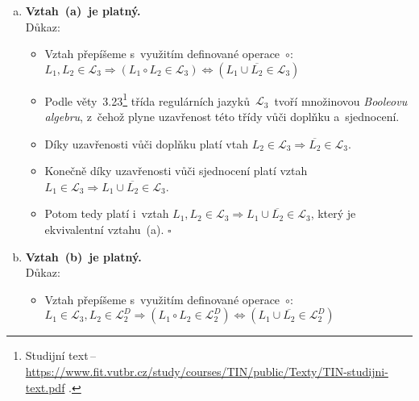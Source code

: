 \documentclass[a4paper, 11pt]{scrartcl}
\newcommand*{\QEDB}{\hfill\ensuremath{\square}}
\begin{document}
    \begin{enumerate}[(a)]
        \item
            \textbf{Vztah~(a)~je platný.} \\
            Důkaz:
            \begin{itemize}
                \item
                    Vztah přepíšeme s~využitím definované operace~$ \circ $: \\
                    $ L_1, L_2 \in \mathcal{L}_3 \Rightarrow (L_1 \circ L_2 \in
                    \mathcal{L}_3) \Leftrightarrow (L_1 \cup \overline{L_2} \in
                    \mathcal{L}_3) $

                \item
                    Podle věty~3.23\footnote{\label{tin}Studijní text\,--\,%
                        \url{https://www.fit.vutbr.cz/study/courses/TIN/public/Texty/TIN-studijni-text.pdf}%
                    .}
                    třída regulárních jazyků~$ \mathcal{L}_3 $~tvoří množinovou
                    \emph{Booleovu algebru}, z~čehož plyne uzavřenost této
                    třídy vůči doplňku a~sjednocení.

                \item
                    Díky uzavřenosti vůči doplňku platí vtah $ L_2 \in
                    \mathcal{L}_3 \Rightarrow \overline{L_2} \in
                    \mathcal{L}_3 $.

                \item
                    Konečně díky uzavřenosti vůči sjednocení platí vztah $ L_1
                    \in \mathcal{L}_3 \Rightarrow L_1 \cup \overline{L_2} \in
                    \mathcal{L}_3 $.

                \item
                    Potom tedy platí i~vztah $ L_1, L_2 \in \mathcal{L}_3
                    \Rightarrow L_1 \cup \overline{L_2} \in \mathcal{L}_3 $,
                    který je ekvivalentní vztahu~(a). \QEDB
            \end{itemize}

        \item
            \textbf{Vztah~(b)~je platný.} \\
            Důkaz:
            \begin{itemize}
                \item
                    Vztah přepíšeme s~využitím definované operace~$ \circ $: \\
                    $ L_1 \in \mathcal{L}_3, L_2 \in \mathcal{L}_2^D \Rightarrow
                    (L_1 \circ L_2 \in \mathcal{L}_2^D) \Leftrightarrow (L_1
                    \cup \overline{L_2} \in \mathcal{L}_2^D) $


\end{itemize}
\end{enumerate}
\end{document}
